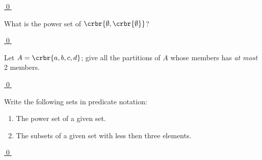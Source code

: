 \documentclass[11pt]{article}
\begin{document}
{\begin{uexercise}
\begin{enumerate}
\end{enumerate}

\hyperlink{ex-partit-sol}{\qed}
\end{uexercise} 

\begin{uexercise}\label{ex-empow}
What is the power set of $\crbr{\emptyset,\crbr{\emptyset}}$?

\hyperlink{ex-empow-sol}{\qed}
\end{uexercise}

\begin{uexercise}\label{ex-tpart}
Let $A=\crbr{a,b,c,d}$; give all the partitions of $A$ whose members has
\emph{at most} 2 members.

\hyperlink{ex-tpart-sol}{\qed}
\end{uexercise}

\begin{uexercise}\label{ex-part-pred}
Write the following sets in predicate notation:
\begin{enumerate}
\item\label{ex-part-pred-a}
The power set of a given set.
\item\label{ex-part-pred-b}
The subsets of a given set with less then three elements.
\end{enumerate}

\hyperlink{ex-part-pred-sol}{\qed}
\end{uexercise}

\hrulefill
}
\end{document}
